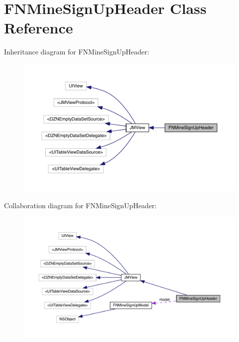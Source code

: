 \hypertarget{interface_f_n_mine_sign_up_header}{}\section{F\+N\+Mine\+Sign\+Up\+Header Class Reference}
\label{interface_f_n_mine_sign_up_header}


Inheritance diagram for F\+N\+Mine\+Sign\+Up\+Header\+:\nopagebreak
\begin{figure}[H]
\begin{center}
\leavevmode
\includegraphics[width=350pt]{interface_f_n_mine_sign_up_header__inherit__graph}
\end{center}
\end{figure}


Collaboration diagram for F\+N\+Mine\+Sign\+Up\+Header\+:\nopagebreak
\begin{figure}[H]
\begin{center}
\leavevmode
\includegraphics[width=350pt]{interface_f_n_mine_sign_up_header__coll__graph}
\end{center}
\end{figure}
